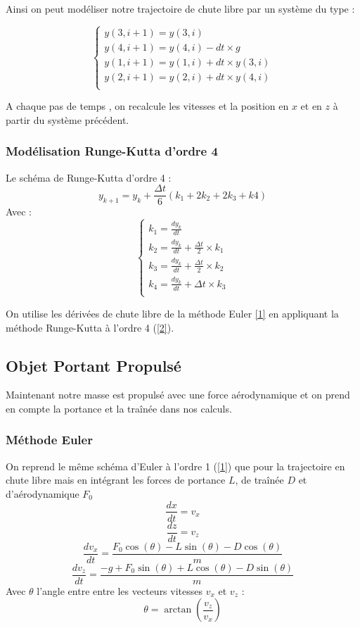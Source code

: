 \documentclass[a4paper,oneside]{article}
\begin{document}
Ainsi on peut modéliser notre trajectoire de chute libre par un système du type : \label{1}

\begin{equation*}
\begin{cases} 
 y(3,i+1) = y(3,i)\\
 y(4,i+1) = y(4,i)  - dt\times g  \\
 y(1,i+1) = y(1,i)  + dt \times y(3,i)\\
 y(2,i+1) = y(2,i)  + dt \times y(4,i)\\
\end{cases}
\end{equation*}

A chaque pas de temps , on recalcule les vitesses et la position en $x$ et en $z$ à partir du système précédent.
  
\subsubsection{Modélisation Runge-Kutta d'ordre 4}
Le schéma de Runge-Kutta d'ordre 4 : \label{2}
\[
y_{k+1} = y_k + \frac{\Delta t}{6} ( k_1 + 2 k_2 + 2 k_3 + k4)
\]
Avec  : 
\begin{equation*}
\begin{cases} 
k_1 = \frac{dy_k}{dt}\\
k_2 = \frac{dy_k}{dt} + \frac{\Delta t }{2}\times k_1\\
k_3 = \frac{dy_k}{dt} + \frac{\Delta t }{2}\times k_2\\
k_4 = \frac{dy_k}{dt} + \Delta t \times k_3\\
\end{cases}
\end{equation*}

On utilise les dérivées de chute libre de la méthode Euler \ref{1} en appliquant la méthode Runge-Kutta à l'ordre 4 (\ref{2}). 


\subsection{Objet Portant Propulsé}

Maintenant notre masse est propulsé avec une force aérodynamique et on prend en compte la portance et la traînée dans nos calculs. 

\subsubsection{Méthode Euler}
On reprend le même schéma d'Euler à l'ordre 1 (\ref{1}) que pour la trajectoire en chute libre mais en intégrant les forces de portance $L$, de traînée $D$ et d'aérodynamique $F_0$
\label{3}
\[
\frac{dx}{dt} = v_{x}
\]
\[
\frac{dz}{dt} = v_{z}
\]
\[
\frac{dv_{x}}{dt} = \frac{  F_0 \cos(\theta) -L\sin(\theta) - D \cos(\theta) }{m}
\]
\[
\frac{dv_{z}}{dt} = \frac{ -g + F_0 \sin(\theta) +L\cos(\theta) - D \sin(\theta) }{m}
\]
 Avec $\theta $ l'angle entre entre les vecteurs vitesses  $v_x$ et $v_z$ : 
 \[
 \theta = \arctan(\frac{v_z}{v_x})
 \]
\end{document}
